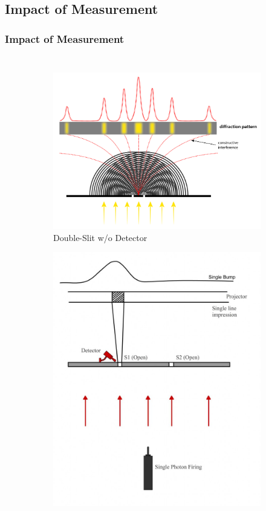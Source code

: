 \documentclass{beamer}
\begin{document}
\subsection{Impact of Measurement}
\begin{frame}
  \frametitle{Impact of Measurement}
  \begin{columns}
    \begin{figure}
      \centering
      \begin{subfigure}[b]{0.45\textwidth}
        \centering
        \includegraphics[scale=0.3]{figures/double-slit-0}
        \caption{Double-Slit w/o Detector}
        \label{fig:doube-slit-0}
      \end{subfigure}
      \hfill
      \begin{subfigure}[b]{0.45\textwidth}
        \centering
        \includegraphics[scale=0.075]{figures/double-slit-1}

\end{subfigure}
\end{figure}
\end{columns}
\end{frame}
\end{document}
